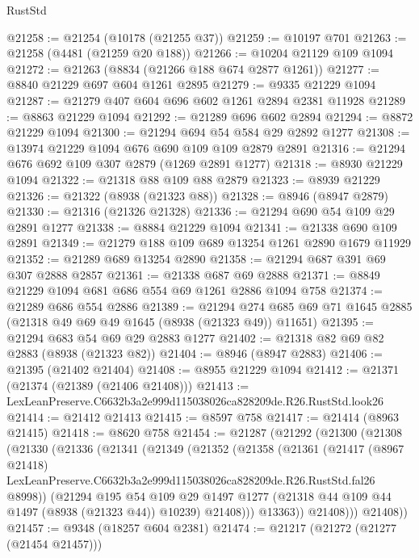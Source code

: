\begin{lexlean}{RustStd}
\begin{coremodule}
@21258 := @21254 (@10178 (@21255 @37))
@21259 := @10197 @701
@21263 := @21258 (@4481 (@21259 @20 @188))
@21266 := @10204 @21129 @109 @1094
@21272 := @21263 (@8834 (@21266 @188 @674 @2877 @1261))
@21277 := @8840 @21229 @697 @604 @1261 @2895
@21279 := @9335 @21229 @1094
@21287 := @21279 @407 @604 @696 @602 @1261 @2894 @2381 @11928
@21289 := @8863 @21229 @1094
@21292 := @21289 @696 @602 @2894
@21294 := @8872 @21229 @1094
@21300 := @21294 @694 @54 @584 @29 @2892 @1277
@21308 := @13974 @21229 @1094 @676 @690 @109 @109 @2879 @2891
@21316 := @21294 @676 @692 @109 @307 @2879 (@1269 @2891 @1277)
@21318 := @8930 @21229 @1094
@21322 := @21318 @88 @109 @88 @2879
@21323 := @8939 @21229
@21326 := @21322 (@8938 (@21323 @88))
@21328 := @8946 (@8947 @2879)
@21330 := @21316 (@21326 @21328)
@21336 := @21294 @690 @54 @109 @29 @2891 @1277
@21338 := @8884 @21229 @1094
@21341 := @21338 @690 @109 @2891
@21349 := @21279 @188 @109 @689 @13254 @1261 @2890 @1679 @11929
@21352 := @21289 @689 @13254 @2890
@21358 := @21294 @687 @391 @69 @307 @2888 @2857
@21361 := @21338 @687 @69 @2888
@21371 := @8849 @21229 @1094 @681 @686 @554 @69 @1261 @2886 @1094 @758
@21374 := @21289 @686 @554 @2886
@21389 := @21294
    @274
    @685
    @69
    @71
    @1645
    @2885
    (@21318 @49 @69 @49 @1645 (@8938 (@21323 @49)) @11651)
@21395 := @21294 @683 @54 @69 @29 @2883 @1277
@21402 := @21318 @82 @69 @82 @2883 (@8938 (@21323 @82))
@21404 := @8946 (@8947 @2883)
@21406 := @21395 (@21402 @21404)
@21408 := @8955 @21229 @1094
@21412 := @21371 (@21374 (@21389 (@21406 @21408)))
@21413 := LexLeanPreserve.C6632b3a2e999d115038026ca828209de.R26.RustStd.look26
@21414 := @21412 @21413
@21415 := @8597 @758
@21417 := @21414 (@8963 @21415)
@21418 := @8620 @758
@21454 := @21287
    (@21292
      (@21300
        (@21308
          (@21330
            (@21336
              (@21341
                (@21349
                  (@21352
                    (@21358
                      (@21361
                        (@21417
                          (@8967 @21418)
                          LexLeanPreserve.C6632b3a2e999d115038026ca828209de.R26.RustStd.fal26
                          @8998))
                      (@21294
                        @195
                        @54
                        @109
                        @29
                        @1497
                        @1277
                        (@21318 @44 @109 @44 @1497 (@8938 (@21323 @44)) @10239)
                        @21408)))
                  @13363))
              @21408)))
        @21408))
@21457 := @9348 (@18257 @604 @2381)
@21474 := @21217
    (@21272 (@21277 (@21454 @21457)))

\end{coremodule}
\end{lexlean}
